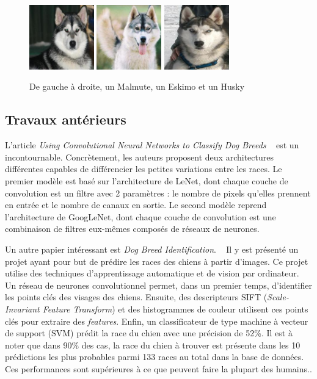 \documentclass{article}
\begin{document}
\begin{figure}[htbp]
    \includegraphics[width=2.8cm]{../dataset/test/n02110063-malamute/n02110063_11838.jpg}\hfill 
    \includegraphics[width=2.8cm]{../dataset/test/n02109961-Eskimo_dog/n02109961_623.jpg}\hfill 
    \includegraphics[width=2.8cm]{../dataset/test/n02110185-Siberian_husky/n02110185_7564.jpg} 
    \caption{De gauche à droite, un Malmute, un Eskimo et un Husky}
    \label{1}
\end{figure} 

\subsection{Travaux antérieurs}
L'article \textit{Using Convolutional Neural Networks to Classify Dog Breeds}
~\cite{fcdh_FinalReport} est un incontournable. Concrètement, les auteurs
proposent  deux architectures différentes capables de différencier les petites
variations entre les races. Le premier modèle est basé sur l'architecture de 
LeNet, dont chaque couche de convolution est un filtre avec 2 paramètres : le 
nombre de pixels qu’elles prennent en entrée et le nombre de canaux en sortie.
Le second modèle reprend l'architecture de GoogLeNet, dont chaque couche de
convolution est une combinaison de filtres eux-mêmes composés de réseaux de
neurones.

Un autre papier intéressant est \textit{Dog Breed Identification}. 
~\cite{output} Il y est présenté un projet ayant pour but de prédire les races
des chiens à partir d’images. Ce projet utilise des techniques d’apprentissage
automatique et de vision par ordinateur. Un réseau de neurones convolutionnel
permet, dans un premier temps, d’identifier les points clés des visages des 
chiens. Ensuite, des descripteurs SIFT (\textit{Scale-Invariant Feature
Transform}) et des histogrammes de couleur utilisent ces points clés pour
extraire des \textit{features}. Enfin, un classificateur de type machine à
vecteur de support (SVM) prédit la race du chien avec une précision de 52\%. Il
est à noter que dans 90\% des cas, la race du chien à trouver est présente dans
les 10 prédictions les plus probables parmi 133 races au total dans la base de 
données. Ces performances sont supérieures à ce que peuvent faire la plupart
des humains..
\end{document}
